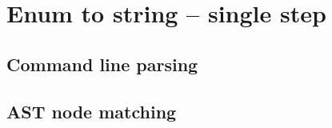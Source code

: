 \section{Enum to string -- single step}

\subsection{Command line parsing}

\subsection{AST node matching}\label{subsec:085tool:enum_node_matching_sin}
